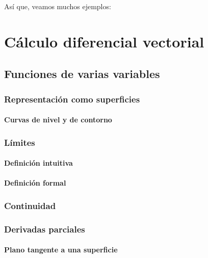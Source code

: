 \documentclass[12pt, fleqn]{report}                             %
\theoremstyle{break}                                            %
\begin{document}
            Así que, veamos muchos ejemplos:


\part{Cálculo diferencial vectorial}

    \chapter{Funciones de varias variables}
    
        \section{Representación como superficies}
        
            \subsection{Curvas de nivel y de contorno}
            
        \section{Límites}
            
            \subsection{Definición intuitiva}
            
            \subsection{Definición formal}
            
        \section{Continuidad}
        
        \section{Derivadas parciales}
        
            \subsection{Plano tangente a una superficie}
            
\end{document}

